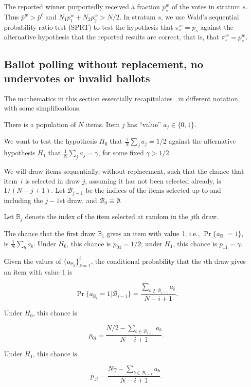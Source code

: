 \documentclass[12pt]{article}
\newcommand{\bp}{\bar{p}}
\begin{document}
The reported winner purportedly received a fraction $p_s^w$ of the votes in stratum $s$.
Thus $\bp^w > \bp^\ell$ and $N_1 p_1^w + N_2p_2^w > N/2$.
In stratum $s$, we use Wald's sequential probability ratio test (SPRT) to
test the hypothesis that $\pi_s^w = p_s$ against the alternative hypothesis 
that the reported results are correct, that is, that $\pi_s^w = p_s^w$.


\subsection{Ballot polling without replacement, no undervotes or invalid ballots}
The mathematics in this section essentially 
recapitulates~\citet[pp43--44]{wald45} in different notation, with some simplifications.

There is a population of $N$ items. 
Item $j$ has ``value'' $a_j \in \{0, 1\}$. 

We want to test the hypothesis $H_0$ that $\frac{1}{N}\sum_j a_j = 1/2$ against the
alternative hypothesis $H_1$ that $\frac{1}{N}\sum_j a_j = \gamma$, for some
fixed $\gamma > 1/2$.

We will draw items sequentially, without replacement, such that the chance that 
item~$i$ is selected in draw $j$, assuming it has not been selected already, is $1/(N-j+1)$.
Let ${\mathcal B_{j-1}}$ be the indices of the items selected up to and including the $j-1$st draw,
and ${\mathcal B_0} \equiv \emptyset$. 

Let $\mathbb B_j$ denote the index of the item selected at random in the $j$th draw.

The chance that the first draw ${\mathbb B_1}$ gives an item with value 1, i.e., 
$\Pr \{a_{\mathbb B_1} = 1\}$, is $\frac{1}{N}\sum_b a_b$.
Under $H_0$, this chance is $p_{01} = 1/2$; under $H_1$, this chance is 
$p_{11} = \gamma$.

Given the values of $\{a_{\mathbb B_k}\}_{k=1}^i$, the conditional
probability that the $i$th draw gives an item with value 1 is

$$
   \Pr \{a_{\mathbb B_i} = 1 | {\mathcal B_{i-1}} \} = \frac{ \sum_{b \notin {\mathcal B_{i-1}}} a_b}{N-i+1}.
$$

Under $H_0$, this chance is

$$
   p_{0i} =  \frac{N/2 - \sum_{b \in {\mathcal B_{i-1}}} a_b}{N - i + 1}.
$$

Under $H_1$, this chance is

$$
   p_{1i} = \frac{N \gamma - \sum_{b \in {\mathcal B_{i-1}}} a_b}{N - i+1}.
$$
\end{document}
